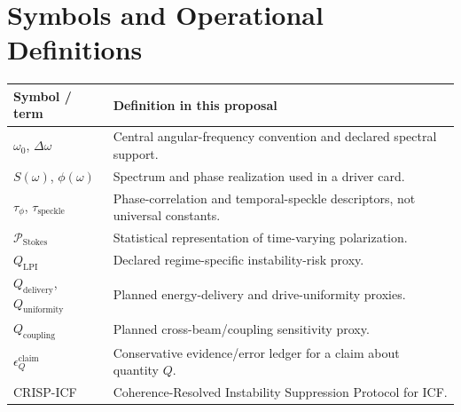 \documentclass[conference]{../../../../Conference-LaTeX-template_10-17-19/IEEEtran}
\begin{document}
\section{Symbols and Operational Definitions}
\begin{tabularx}{0.96\columnwidth}{lY}
\toprule
Symbol / term & Definition in this proposal \\
\midrule
$\omega_0$, $\Delta\omega$ & Central angular-frequency convention and declared spectral support. \\
$S(\omega)$, $\phi(\omega)$ & Spectrum and phase realization used in a driver card. \\
$\tau_{\phi}$, $\tau_{\mathrm{speckle}}$ & Phase-correlation and temporal-speckle descriptors, not universal constants. \\
$\mathcal{P}_{\mathrm{Stokes}}$ & Statistical representation of time-varying polarization. \\
$Q_{\mathrm{LPI}}$ & Declared regime-specific instability-risk proxy. \\
$Q_{\mathrm{delivery}}$, $Q_{\mathrm{uniformity}}$ & Planned energy-delivery and drive-uniformity proxies. \\
$Q_{\mathrm{coupling}}$ & Planned cross-beam/coupling sensitivity proxy. \\
$\epsilon_Q^{\mathrm{claim}}$ & Conservative evidence/error ledger for a claim about quantity $Q$. \\
CRISP-ICF & Coherence-Resolved Instability Suppression Protocol for ICF. \\
\bottomrule
\end{tabularx}
\end{document}
